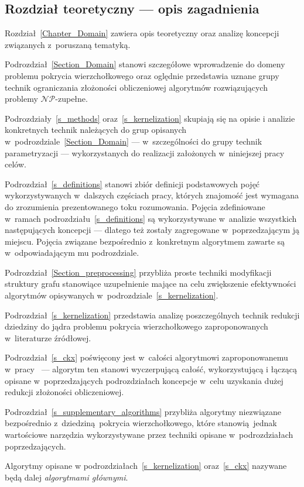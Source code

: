 \subsection{Rozdział teoretyczny --- opis zagadnienia}
\par{
  Rozdział~\ref{Chapter_Domain} zawiera opis teoretyczny oraz analizę koncepcji związanych z~poruszaną tematyką.

  Podrozdział~\ref{Section_Domain} stanowi szczegółowe wprowadzenie do domeny problemu pokrycia wierzchołkowego oraz oględnie przedstawia uznane grupy technik ograniczania złożoności obliczeniowej algorytmów rozwiązujących problemy $\mathcal{NP}$-zupełne.

  Podrozdziały~\ref{s_methods} oraz~\ref{s_kernelization} skupiają się na opisie i analizie konkretnych technik należących do grup opisanych w~podrozdziale~\ref{Section_Domain} --- w~szczególności do grupy technik parametryzacji --- wykorzystanych do realizacji założonych w~niniejszej pracy celów.

  Podrozdział~\ref{s_definitions} stanowi zbiór definicji podstawowych pojęć wykorzystywanych w~dalszych częściach pracy, których znajomość jest wymagana do zrozumienia prezentowanego toku rozumowania.
  Pojęcia zdefiniowane w~ramach podrozdziału~\ref{s_definitions} są wykorzystywane w~analizie wszystkich następujących koncepcji --- dlatego też zostały zagregowane w~poprzedzającym ją miejscu.
  Pojęcia związane bezpośrednio z~konkretnym algorytmem zawarte są w~odpowiadającym mu podrozdziale.

  Podrozdział~\ref{Section_preprocessing} przybliża proste techniki modyfikacji struktury grafu stanowiące uzupełnienie mające na celu zwiększenie efektywności algorytmów opisywanych w~podrozdziale~\ref{s_kernelization}.

  Podrozdział~\ref{s_kernelization} przedstawia analizę poszczególnych technik redukcji dziedziny do jądra problemu pokrycia wierzchołkowego zaproponowanych w~literaturze źródłowej.

  Podrozdział~\ref{s_ckx} poświęcony jest w~całości algorytmowi zaproponowanemu w~pracy~\cite{ImprovedBounds10} --- algorytm ten stanowi wyczerpującą całość, wykorzystującą i łączącą opisane w~poprzedzających podrozdziałach koncepcje w~celu uzyskania dużej redukcji złożoności obliczeniowej.

  Podrozdział~\ref{s_supplementary_algorithms} przybliża algorytmy niezwiązane bezpośrednio z~dziedziną pokrycia wierzchołkowego, które stanowią jednak wartościowe narzędzia wykorzystywane przez techniki opisane w~podrozdziałach poprzedzających.

  Algorytmy opisane w podrozdziałach~\ref{s_kernelization} oraz~\ref{s_ckx} nazywane będą dalej \emph{algorytmami głównymi}.
}
